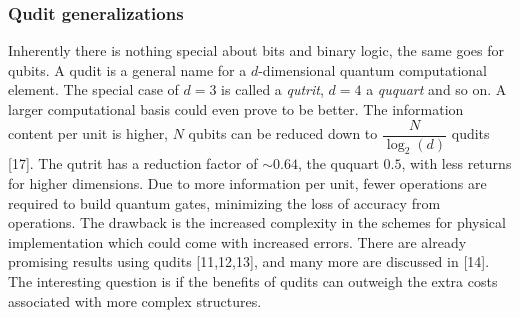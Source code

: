 \subsubsection{Qudit generalizations}
Inherently there is nothing special about bits and binary logic, the same goes for qubits.  A qudit is a general name for a  $d$-dimensional quantum computational element. The special case of $d = 3$ is called a \textit{qutrit}, $d = 4$ a \textit{ququart} and so on. A larger computational basis could even prove to be better. The information content per unit is higher, $N$ qubits can be reduced down to $\dfrac{N}{\log_2(d)}$ qudits [17]. The qutrit has a reduction factor of $\sim 0.64$, the ququart $0.5$, with less returns for higher dimensions. Due to more information per unit, fewer operations are required to build quantum gates, minimizing the loss of accuracy from operations. The drawback is the increased complexity in the schemes for physical implementation which could come with increased errors. There are already promising results using qudits [11,12,13], and many more are discussed in [14]. The interesting question is if the benefits of qudits can outweigh the extra costs associated with more complex structures.

